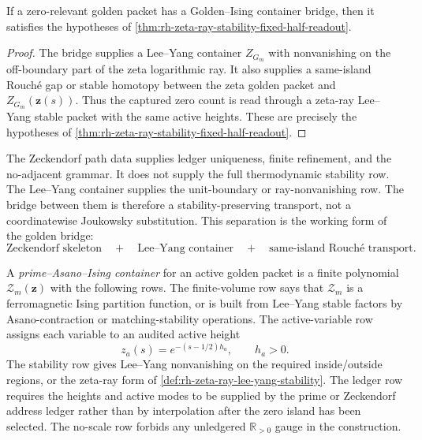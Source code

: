 \begin{theorem}
\label{thm:rh-golden-ising-bridge-gives-zeta-ray-stability}
If a zero-relevant golden packet has a Golden--Ising container bridge,
then it satisfies the hypotheses of
\autoref{thm:rh-zeta-ray-stability-fixed-half-readout}.
\end{theorem}

\begin{proof}
The bridge supplies a Lee--Yang container $Z_{G_m}$ with nonvanishing on
the off-boundary part of the zeta logarithmic ray.  It also supplies a
same-island Rouch\'e gap or stable homotopy between the zeta golden
packet and $Z_{G_m}(\mathbf z(s))$.  Thus the captured zero count is read
through a zeta-ray Lee--Yang stable packet with the same active heights.
These are precisely the hypotheses of
\autoref{thm:rh-zeta-ray-stability-fixed-half-readout}.
\end{proof}

\begin{principle}
\label{prin:rh-skeleton-container-separation}
The Zeckendorf path data supplies ledger uniqueness, finite
refinement, and the no-adjacent grammar.  It does not supply the full
thermodynamic stability row.  The Lee--Yang container supplies the
unit-boundary or ray-nonvanishing row.  The bridge between them is
therefore a stability-preserving transport, not a coordinatewise
Joukowsky substitution.  This separation is the working form of the
golden bridge:
$$
\text{Zeckendorf skeleton}
\quad+\quad
\text{Lee--Yang container}
\quad+\quad
\text{same-island Rouch\'e transport}.
$$
\end{principle}

\begin{definition}
\label{def:rh-prime-asano-ising-container}
A \emph{prime--Asano--Ising container} for an active golden packet is a
finite polynomial $\mathcal Z_m(\mathbf z)$ with the following rows.
The finite-volume row says that $\mathcal Z_m$ is a ferromagnetic Ising
partition function, or is built from Lee--Yang stable factors by
Asano-contraction or matching-stability operations.  The active-variable
row assigns each variable to an audited active height
$$
z_a(s)=e^{-(s-1/2)h_a},
\qquad
h_a>0.
$$
The stability row gives Lee--Yang nonvanishing on the required
inside/outside regions, or the zeta-ray form of
\autoref{def:rh-zeta-ray-lee-yang-stability}.  The ledger row requires
the heights and active modes to be supplied by the prime or Zeckendorf
address ledger rather than by interpolation after the zero island has
been selected.
The no-scale row forbids any unledgered $\mathbb R_{>0}$ gauge in the
construction.
\end{definition}

